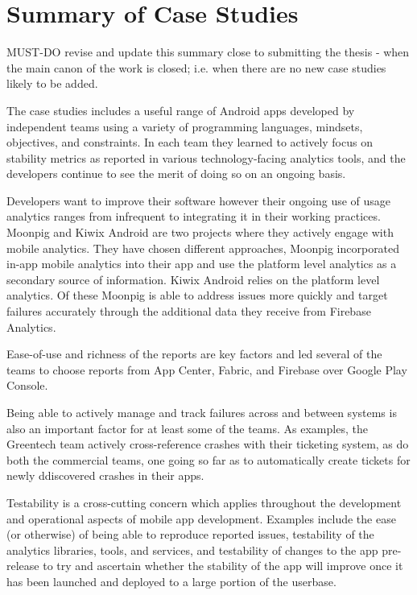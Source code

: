 \section{Summary of Case Studies}
MUST-DO revise and update this summary close to submitting the thesis - when the main canon of the work is closed; i.e. when there are no new case studies likely to be added.

The case studies includes a useful range of Android apps developed by independent teams using a variety of programming languages, mindsets, objectives, and constraints. In each team they learned to actively focus on stability metrics as reported in various technology-facing analytics tools, and the developers continue to see the merit of doing so on an ongoing basis.

Developers want to improve their software however their ongoing use of usage analytics ranges from infrequent to integrating it in their working practices. Moonpig and Kiwix Android are two projects where they actively engage with mobile analytics. They have chosen different approaches, Moonpig incorporated in-app mobile analytics into their app and use the platform level analytics as a secondary source of information. Kiwix Android relies on the platform level analytics. Of these Moonpig is able to address issues more quickly and target failures accurately through the additional data they receive from Firebase Analytics. 

Ease-of-use and richness of the reports are key factors and led several of the teams to choose reports from App Center, Fabric, and Firebase over Google Play Console.

Being able to actively manage and track failures across and between systems is also an important factor for at least some of the teams. As examples, the Greentech team actively cross-reference crashes with their ticketing system, as do both the commercial teams, one going so far as to automatically create tickets for newly ddiscovered crashes in their apps.


Testability is a cross-cutting concern which applies throughout the development and operational aspects of mobile app development. Examples include the ease (or otherwise) of being able to reproduce reported issues, testability of the analytics libraries, tools, and services, and testability of changes to the app pre-release to try and ascertain whether the stability of the app will improve once it has been launched and deployed to a large portion of the userbase.






